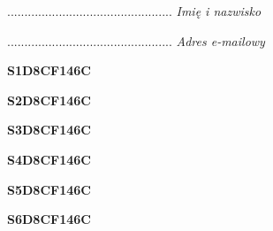 \begin{turn}{90}\begin{minipage}{\linewidth} \vspace{20mm} ................................................  \textit{Imię i nazwisko}\end{minipage}\end{turn}

\begin{turn}{90}\begin{minipage}{\linewidth} \vspace{20mm} ................................................  \textit{Adres e-mailowy}\end{minipage}\end{turn}

\begin{turn}{90}\huge \begin{minipage}{\linewidth} \vspace{10mm}\textbf{S1D8CF146C}\end{minipage}\end{turn}

\begin{turn}{90}\huge \begin{minipage}{\linewidth} \vspace{10mm}\textbf{S2D8CF146C}\end{minipage}\end{turn}

\begin{turn}{90}\huge \begin{minipage}{\linewidth} \vspace{10mm}\textbf{S3D8CF146C}\end{minipage}\end{turn}

\begin{turn}{90}\huge \begin{minipage}{\linewidth} \vspace{10mm}\textbf{S4D8CF146C}\end{minipage}\end{turn}

\begin{turn}{90}\huge \begin{minipage}{\linewidth} \vspace{10mm}\textbf{S5D8CF146C}\end{minipage}\end{turn}

\begin{turn}{90}\huge \begin{minipage}{\linewidth} \vspace{10mm}\textbf{S6D8CF146C}\end{minipage}\end{turn}

